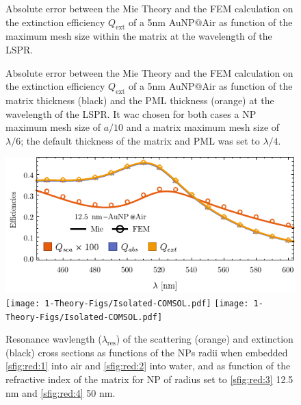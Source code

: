 %
\begin{figure}[h!]\centering
	\def\svgwidth{.8\textwidth} \small
{}
\vspace*{-1em}
\caption[Extinction Efficiency Absolute Error: Matrix Max Mesh Size Analysis]{Absolute error between the Mie Theory and the FEM calculation on the extinction efficiency $Q_\text{ext}$ of a 5nm AuNP$@$Air as function of the maximum mesh size within the matrix at the wavelength of the LSPR.}
\label{fig:Eff:sphere:matrix}
\end{figure}


\begin{figure}[h!]\centering
	\def\svgwidth{.8\textwidth} \small
{}
\vspace*{-1em}
\caption[Extinction Efficiency Absolute Error: Matrix and PML Thickness Analysis]{Absolute error between the Mie Theory and the FEM calculation on the extinction efficiency $Q_\text{ext}$ of a 5nm AuNP$@$Air as function of the matrix thickness (black) and the PML thickness (orange) at the wavelength of the LSPR. It wac chosen for both cases a NP maximum mesh size of $a/10$ and a matrix maximum mesh size of $\lambda/6$; the default thickness of the matrix and PML was set to $\lambda/4$.}
\label{fig:Eff:sphere:thickness}
\end{figure}











\begin{figure}\centering
\includegraphics[width = .8\textwidth ]{1-Theory-Figs/Mie-FEM_Air.pdf}\\
\texttt{[image: 1-Theory-Figs/Isolated-COMSOL.pdf]}%
\texttt{[image: 1-Theory-Figs/Isolated-COMSOL.pdf]}%
\caption[Convergence tests: The Meshing]{Resonance wavlength ($\lambda_\text{res}$) of the scattering (orange) and extinction (black) cross sections as functions of the NPs radii when embedded  \ref{sfig:red:1} into air and \ref{sfig:red:2} into water, and as function of the refractive index of the matrix for NP of radius set to  \ref{sfig:red:3} 12.5 nm and \ref{sfig:red:4} 50 nm.}
\end{figure}
